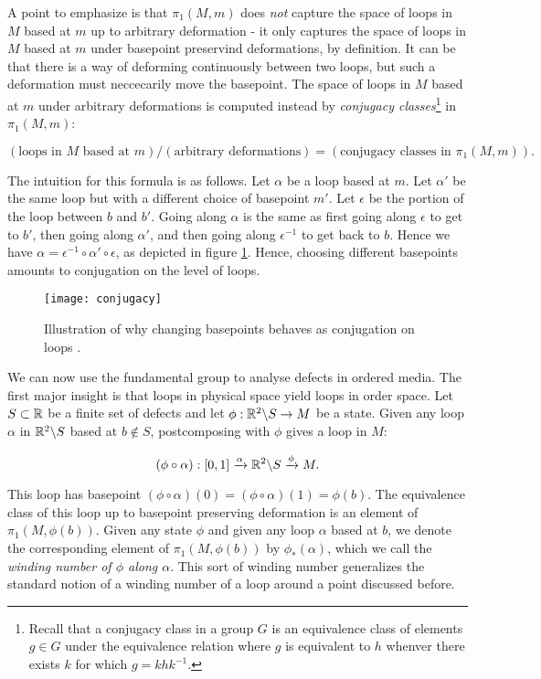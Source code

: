A point to emphasize is that $\pi_1(M,m)$ does \textit{not} capture the space of loops in $M$ based at $m$ up to arbitrary deformation - it only captures the space of loops in $M$ based at $m$ under basepoint preservind deformations, by definition. It can be that there is a way of deforming continuously between two loops, but such a deformation must neccecarily move the basepoint. The space of loops in $M$ based at $m$ under arbitrary deformations is computed instead by \textit{conjugacy classes}\footnote{Recall that a conjugacy class in a group $G$ is an equivalence class of elements $g\in G$ under the equivalence relation where $g$ is equivalent to $h$ whenver there exists $k$ for which $g=k h k^{-1}$.} in $\pi_1(M,m)$:

$$\left(\text{loops in $M$ based at $m$}\right)/\left(\text{arbitrary deformations}\right)= \left(\text{conjugacy classes in }\pi_1(M,m)\right).$$

The intuition for this formula is as follows. Let $\alpha$ be a loop based at $m$. Let $\alpha'$ be the same loop but with a different choice of basepoint $m'$. Let $\epsilon$ be the portion of the loop between $b$ and $b'$. Going along $\alpha$ is the same as first going along $\epsilon$ to get to $b'$, then going along $\alpha'$, and then going along $\epsilon^{-1}$ to get back to $b$. Hence we have $\alpha = \epsilon^{-1}\circ \alpha' \circ \epsilon$, as depicted in figure \ref{fig:conjugacy}. Hence, choosing different basepoints amounts to conjugation on the level of loops.

\begin{figure}
\begin{center}
\texttt{[image: conjugacy]}
\caption{Illustration of why changing basepoints behaves as conjugation on loops .}
\label{fig:conjugacy}
\end{center}
\end{figure}

We can now use the fundamental group to analyse defects in ordered media. The first major insight is that loops in physical space yield loops in order space. Let $S\subset \mathbb{R}$ be a finite set of defects and let $\phi: \mathbb{R}^2 \backslash S \to M$ be a state. Given any loop $\alpha$ in $\mathbb{R}^2\backslash S$ based at $b\not\in S$, postcomposing with $\phi$ gives a loop in $M$:

$$(\phi \circ \alpha): [0,1]\xrightarrow{\alpha} \mathbb{R}^2 \backslash S \xrightarrow{\phi} M.$$

This loop has basepoint $(\phi \circ \alpha)(0)=(\phi\circ \alpha)(1)=\phi(b)$. The equivalence class of this loop up to basepoint preserving deformation is an element of $\pi_1(M,\phi(b))$. Given any state $\phi$ and given any loop $\alpha$ based at $b$, we denote the corresponding element of $\pi_1(M,\phi(b))$ by $\phi_*(\alpha)$, which we call the \textit{winding number of $\phi$ along $\alpha$}. This sort of winding number generalizes the standard notion of a winding number of a loop around a point discussed before.


